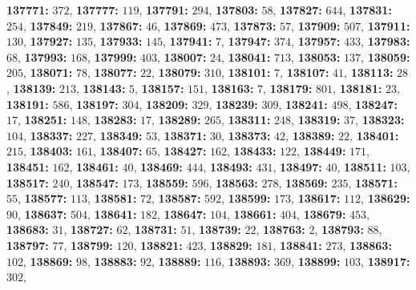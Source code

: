 \textsf{\bfseries 137771:} $372$, \textsf{\bfseries 137777:} $119$, \textsf{\bfseries 137791:} $294$, \textsf{\bfseries 137803:} $58$, \textsf{\bfseries 137827:} $644$, \textsf{\bfseries 137831:} $254$, \textsf{\bfseries 137849:} $219$, \textsf{\bfseries 137867:} $46$, \textsf{\bfseries 137869:} $473$, \textsf{\bfseries 137873:} $57$, \textsf{\bfseries 137909:} $507$, \textsf{\bfseries 137911:} $130$, \textsf{\bfseries 137927:} $135$, \textsf{\bfseries 137933:} $145$, \textsf{\bfseries 137941:} $7$, \textsf{\bfseries 137947:} $374$, \textsf{\bfseries 137957:} $433$, \textsf{\bfseries 137983:} $68$, \textsf{\bfseries 137993:} $168$, \textsf{\bfseries 137999:} $403$, \textsf{\bfseries 138007:} $24$, \textsf{\bfseries 138041:} $713$, \textsf{\bfseries 138053:} $137$, \textsf{\bfseries 138059:} $205$, \textsf{\bfseries 138071:} $78$, \textsf{\bfseries 138077:} $22$, \textsf{\bfseries 138079:} $310$, \textsf{\bfseries 138101:} $7$, \textsf{\bfseries 138107:} $41$, \textsf{\bfseries 138113:} $28$, \textsf{\bfseries 138139:} $213$, \textsf{\bfseries 138143:} $5$, \textsf{\bfseries 138157:} $151$, \textsf{\bfseries 138163:} $7$, \textsf{\bfseries 138179:} $801$, \textsf{\bfseries 138181:} $23$, \textsf{\bfseries 138191:} $586$, \textsf{\bfseries 138197:} $304$, \textsf{\bfseries 138209:} $329$, \textsf{\bfseries 138239:} $309$, \textsf{\bfseries 138241:} $498$, \textsf{\bfseries 138247:} $17$, \textsf{\bfseries 138251:} $148$, \textsf{\bfseries 138283:} $17$, \textsf{\bfseries 138289:} $265$, \textsf{\bfseries 138311:} $248$, \textsf{\bfseries 138319:} $37$, \textsf{\bfseries 138323:} $104$, \textsf{\bfseries 138337:} $227$, \textsf{\bfseries 138349:} $53$, \textsf{\bfseries 138371:} $30$, \textsf{\bfseries 138373:} $42$, \textsf{\bfseries 138389:} $22$, \textsf{\bfseries 138401:} $215$, \textsf{\bfseries 138403:} $161$, \textsf{\bfseries 138407:} $65$, \textsf{\bfseries 138427:} $162$, \textsf{\bfseries 138433:} $122$, \textsf{\bfseries 138449:} $171$, \textsf{\bfseries 138451:} $162$, \textsf{\bfseries 138461:} $40$, \textsf{\bfseries 138469:} $444$, \textsf{\bfseries 138493:} $431$, \textsf{\bfseries 138497:} $40$, \textsf{\bfseries 138511:} $103$, \textsf{\bfseries 138517:} $240$, \textsf{\bfseries 138547:} $173$, \textsf{\bfseries 138559:} $596$, \textsf{\bfseries 138563:} $278$, \textsf{\bfseries 138569:} $235$, \textsf{\bfseries 138571:} $55$, \textsf{\bfseries 138577:} $113$, \textsf{\bfseries 138581:} $72$, \textsf{\bfseries 138587:} $592$, \textsf{\bfseries 138599:} $173$, \textsf{\bfseries 138617:} $112$, \textsf{\bfseries 138629:} $90$, \textsf{\bfseries 138637:} $504$, \textsf{\bfseries 138641:} $182$, \textsf{\bfseries 138647:} $104$, \textsf{\bfseries 138661:} $404$, \textsf{\bfseries 138679:} $453$, \textsf{\bfseries 138683:} $31$, \textsf{\bfseries 138727:} $62$, \textsf{\bfseries 138731:} $51$, \textsf{\bfseries 138739:} $22$, \textsf{\bfseries 138763:} $2$, \textsf{\bfseries 138793:} $88$, \textsf{\bfseries 138797:} $77$, \textsf{\bfseries 138799:} $120$, \textsf{\bfseries 138821:} $423$, \textsf{\bfseries 138829:} $181$, \textsf{\bfseries 138841:} $273$, \textsf{\bfseries 138863:} $102$, \textsf{\bfseries 138869:} $98$, \textsf{\bfseries 138883:} $92$, \textsf{\bfseries 138889:} $116$, \textsf{\bfseries 138893:} $369$, \textsf{\bfseries 138899:} $103$, \textsf{\bfseries 138917:} $302$, 
